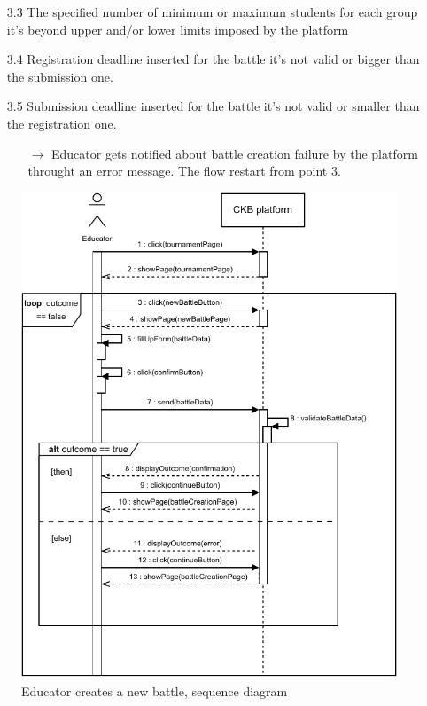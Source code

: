 \documentclass{article}
\begin{document}
{\begin{enumerate}
\begin{xltabular}{\textwidth}
\begin{itemize}
                        allowed programming languages.
                  \item[3.3] The specified number of minimum or maximum students for each group
                        it's beyond upper and/or lower limits imposed by the platform
                  \item[3.4] Registration deadline inserted for the battle it's not valid or
                        bigger than the submission one.
                  \item[3.5] Submission deadline inserted for the battle it's not valid or
                        smaller than the registration one.
                        \begin{itemize}
                            \item[$\rightarrow$] Educator gets notified about battle creation failure
                                  by the platform throught an error message. The flow restart from point 3.
                        \end{itemize}
              \end{itemize}
          \end{xltabular}

          \begin{figure}[H]
              \centering
              \includegraphics[scale=0.95]{SequenceDiagrams/Sequence6.pdf}
              \caption{Educator creates a new battle, sequence diagram}
              \label{fig:BattleCreationSeqDiagram}
          \end{figure}


\end{enumerate}}
\end{document}

